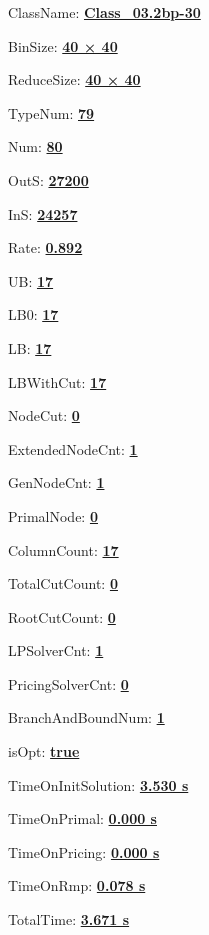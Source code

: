 \documentclass[11pt]{article}
\begin{document}
\pagestyle{empty}


ClassName: \underline{\textbf{Class_03.2bp-30}}
\par
BinSize: \underline{\textbf{40 × 40}}
\par
ReduceSize: \underline{\textbf{40 × 40}}
\par
TypeNum: \underline{\textbf{79}}
\par
Num: \underline{\textbf{80}}
\par
OutS: \underline{\textbf{27200}}
\par
InS: \underline{\textbf{24257}}
\par
Rate: \underline{\textbf{0.892}}
\par
UB: \underline{\textbf{17}}
\par
LB0: \underline{\textbf{17}}
\par
LB: \underline{\textbf{17}}
\par
LBWithCut: \underline{\textbf{17}}
\par
NodeCut: \underline{\textbf{0}}
\par
ExtendedNodeCnt: \underline{\textbf{1}}
\par
GenNodeCnt: \underline{\textbf{1}}
\par
PrimalNode: \underline{\textbf{0}}
\par
ColumnCount: \underline{\textbf{17}}
\par
TotalCutCount: \underline{\textbf{0}}
\par
RootCutCount: \underline{\textbf{0}}
\par
LPSolverCnt: \underline{\textbf{1}}
\par
PricingSolverCnt: \underline{\textbf{0}}
\par
BranchAndBoundNum: \underline{\textbf{1}}
\par
isOpt: \underline{\textbf{true}}
\par
TimeOnInitSolution: \underline{\textbf{3.530 s}}
\par
TimeOnPrimal: \underline{\textbf{0.000 s}}
\par
TimeOnPricing: \underline{\textbf{0.000 s}}
\par
TimeOnRmp: \underline{\textbf{0.078 s}}
\par
TotalTime: \underline{\textbf{3.671 s}}
\par
\newpage


\end{document}
